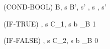 \begin{center}
	(COND-BOOL)
	\prooftree
		\langle B, s \rangle \rightarrow \langle B', s' \rangle
		\justifies
		\langle {}, s \rangle \rightarrow \langle {}, s' \rangle
	\endprooftree
\end{center}

\begin{center}
	(IF-TRUE)
	\prooftree
		\justifies
		\langle {}, s \rangle \rightarrow \langle C_1, s \rangle
		\using b \sqsubseteq_B 1
	\endprooftree
\end{center}

\begin{center}
	(IF-FALSE)
	\prooftree
		\justifies
		\langle {}, s \rangle \rightarrow \langle C_2, s \rangle
		\using b \sqsubseteq_B 0
	\endprooftree
\end{center}
